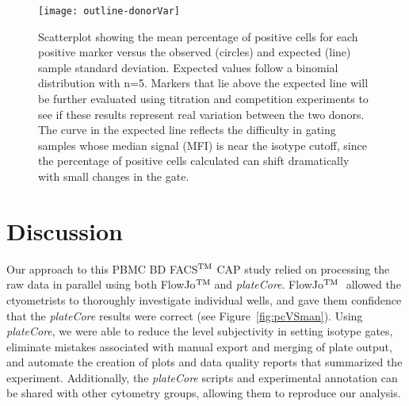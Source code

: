 \documentclass[12pt]{article}
\newcommand{\Rpackage}[1]{{\textit{#1}}}
\def\tm{$^{\rm \text{TM }}$}
\begin{document}
\begin{figure}
\centering
\texttt{[image: outline-donorVar]}
\caption{Scatterplot showing the mean percentage of positive cells for each positive marker
versus the observed (circles) and expected (line) sample standard deviation. Expected
values follow a binomial distribution with n=5. Markers that lie above the expected line will be 
further evaluated using titration and competition experiments to see if these results represent
real variation between the two donors. The curve in the expected line reflects the difficulty
in gating samples whose median signal (MFI) is near the isotype cutoff, since the percentage of positive 
cells calculated can shift dramatically with small changes in the gate.}
\label{fig:donorVar}
\end{figure}

%
%
%
%
%
%


\clearpage
\section*{Discussion}

Our approach to this PBMC BD FACS\tm CAP study relied on processing the raw data
in parallel using both FlowJo\tm and \Rpackage{plateCore}. FlowJo\tm
allowed the ctyometrists to thoroughly investigate individual wells, and gave them confidence
that the \Rpackage{plateCore} results were correct (see Figure~\ref{fig:pcVSman}). Using
\Rpackage{plateCore}, we were able to reduce the level subjectivity in setting isotype gates,
eliminate mistakes associated with manual export and merging of plate output,
and automate the creation of plots and data quality reports that summarized the experiment. 
Additionally, the \Rpackage{plateCore} scripts and experimental annotation can
be shared with other cytometry groups, allowing them to reproduce our analysis. 
\end{document}
